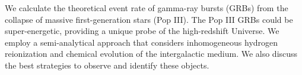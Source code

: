 


\bigskip



\bigskip

\noindent We calculate the theoretical event rate of gamma-ray bursts (GRBs)  from the collapse of massive first-generation stars (Pop III). The Pop III GRBs could be super-energetic, providing a unique probe of the high-redshift Universe. We employ a semi-analytical approach that considers inhomogeneous hydrogen reionization and chemical evolution of the intergalactic medium. We also discuss the best strategies to observe and identify these objects.
